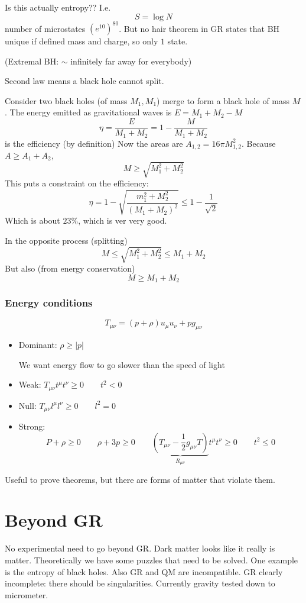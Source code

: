 Is this actually entropy?? I.e. 
\[ S = \log N \]
number of microstates $(e^10)^80$. But no hair theorem in GR states that BH unique if defined mass and charge, so only $1$ state.

(Extremal BH: $\sim$ infinitely far away for everybody)

Second law means a black hole cannot split. 

Consider two black holes (of mass $M_1, M_1$) merge to form a black hole of mass $M$. The energy emitted as gravitational waves is $E=M_1+M_2 - M$
\[ \eta = \frac{E}{M_1 + M_2} = 1- \frac{M}{M_1 +M_2} \]
is the efficiency (by definition)
Now the areas are $A_{1,2} = 16\pi M^2_{1,2}$.
Because $A\geq A_1+A_2$,
\[ M\geq \sqrt{M_1^2 + M_2^2} \]
This puts a constraint on the efficiency:
\[ \eta = 1 - \sqrt{\frac{m_1^2 + M_2^2}{(M_1+M_2)^2}} \leq 1- \frac{1}{\sqrt{2}} \]
Which is about $23\%$, which is ver very good.

In the opposite process (splitting)
\[ M \leq \sqrt{M_1^2+M_2^2} \leq M_1 + M_2 \]
But also (from energy conservation)
\[ M \geq M_1 + M_2 \]

\subsection{Energy conditions}
\[ T_{\mu\nu} = (p+\rho)u_\mu u_\nu + p g_{\mu\nu} \]

\begin{itemize}
\item Dominant: $\rho \geq |p|$

We want energy flow to go slower than the speed of light
\item Weak: $T_{\mu\nu}t^\mu t^\nu \geq 0 \qquad t^2 < 0$
\item Null: $T_{\mu\nu}l^\mu l^\nu \geq 0 \qquad l^2 = 0$
\item Strong:
\[ P+\rho \geq 0 \qquad \rho + 3 p \geq 0 \qquad \underbrace{(T_{\mu\nu} - \frac{1}{2}g_{\mu\nu}T)}_{R_{\mu\nu}}t^\mu t^\nu \geq 0 \qquad t^2 \leq 0 \]
\end{itemize}
Useful to prove theorems, but there are forms of matter that violate them.

\chapter{Beyond GR}
No experimental need to go beyond GR. Dark matter looks like it really is matter. Theoretically we have some puzzles that need to be solved. One example is the entropy of black holes. Also GR and QM are incompatible. GR clearly incomplete: there should be singularities. Currently gravity tested down to micrometer.

